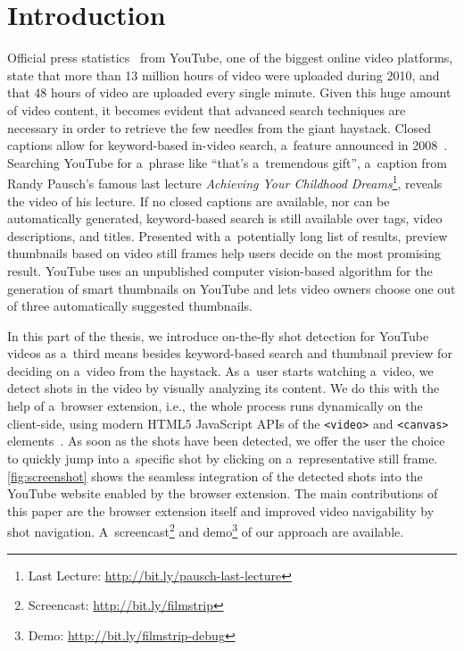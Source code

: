 \section{Introduction}
Official press statistics~\cite{youtube:stats} from YouTube, one of the biggest online video platforms, state that more than 13 million hours of video were uploaded during 2010, and that 48 hours of video are uploaded every single minute. Given this huge amount of video content, it becomes evident that advanced search techniques are necessary in order to retrieve the few needles from the giant haystack. Closed captions allow for keyword-based in-video search, a~feature announced in 2008~\cite{googlevideo}. Searching YouTube for a~phrase like ``that's a~tremendous gift'', a~caption from Randy Pausch's famous last lecture \emph{Achieving Your Childhood Dreams}\footnote{Last Lecture: \url{http://bit.ly/pausch-last-lecture}}, reveals the video of his lecture. If no closed captions are available, nor can be automatically generated, keyword-based search is still available over tags, video descriptions, and titles. Presented with a~potentially long list of results, preview thumbnails based on video still frames help users decide on the most promising result. YouTube uses an unpublished computer vision-based algorithm for the generation of smart thumbnails on YouTube and lets video owners choose one out of three automatically suggested thumbnails.

In this part of the thesis, we introduce on-the-fly shot detection for YouTube videos as a~third means besides keyword-based search and thumbnail preview for deciding on a~video from the haystack. As a~user starts watching a~video, we detect shots in the video by visually analyzing its content. We do this with the help of a~browser extension, i.e., the whole process runs dynamically on the client-side, using modern HTML5 JavaScript APIs of the \texttt{<video>} and \texttt{<canvas>} elements~\cite{Hickson2011}. As soon as the shots have been detected, we offer the user the choice to quickly jump into a~specific shot by clicking on a~representative still frame. \autoref{fig:screenshot} shows the seamless integration of the detected shots into the YouTube website enabled by the browser extension. The main contributions of this paper are the browser extension itself and improved video navigability by shot navigation. A~screencast\footnote{Screencast: \url{http://bit.ly/filmstrip}} and demo\footnote{Demo: \url{http://bit.ly/filmstrip-debug}} of our approach are available.


